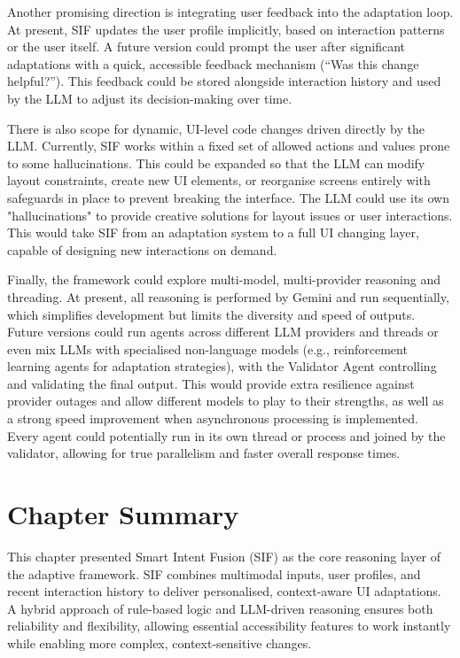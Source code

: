 Another promising direction is integrating user feedback into the adaptation loop. At present, SIF updates the user profile implicitly, based on interaction patterns or the user itself. A future version could prompt the user after significant adaptations with a quick, accessible feedback mechanism (“Was this change helpful?”). This feedback could be stored alongside interaction history and used by the LLM to adjust its decision-making over time. 

There is also scope for dynamic, UI-level code changes driven directly by the LLM. Currently, SIF works within a fixed set of allowed actions and values prone to some hallucinations. This could be expanded so that the LLM can modify layout constraints, create new UI elements, or reorganise screens entirely with safeguards in place to prevent breaking the interface. The LLM could use its own "hallucinations" to provide creative solutions for layout issues or user interactions. This would take SIF from an adaptation system to a full UI changing layer, capable of designing new interactions on demand.

Finally, the framework could explore multi-model, multi-provider reasoning and threading. At present, all reasoning is performed by Gemini and run sequentially, which simplifies development but limits the diversity and speed of outputs. Future versions could run agents across different LLM providers and threads or even mix LLMs with specialised non-language models (e.g., reinforcement learning agents for adaptation strategies), with the Validator Agent controlling and validating the final output. This would provide extra resilience against provider outages and allow different models to play to their strengths, as well as a strong speed improvement when asynchronous processing is implemented. Every agent could potentially run in its own thread or process and joined by the validator, allowing for true parallelism and faster overall response times.

\section{Chapter Summary}
This chapter presented Smart Intent Fusion (SIF) as the core reasoning layer of the adaptive framework. SIF combines multimodal inputs, user profiles, and recent interaction history to deliver personalised, context-aware UI adaptations. A hybrid approach of rule-based logic and LLM-driven reasoning ensures both reliability and flexibility, allowing essential accessibility features to work instantly while enabling more complex, context-sensitive changes.

